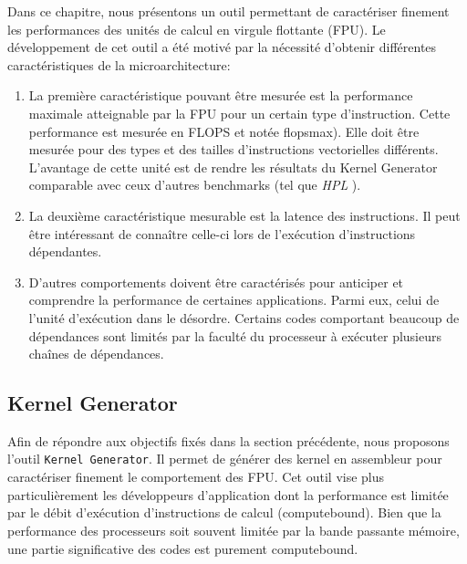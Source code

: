         Dans ce chapitre, nous présentons  un outil permettant de caractériser finement les performances des unités de calcul en virgule flottante (\gls{FPU}). Le développement de cet outil a été motivé par la nécessité d'obtenir différentes caractéristiques de la microarchitecture:
        \begin{enumerate}
            \item La première caractéristique pouvant être mesurée est la performance maximale atteignable par la FPU pour un certain type d'instruction. Cette performance est mesurée en \gls{FLOPS} et notée \gls{flopsmax}). Elle doit être mesurée pour des types et des tailles d'instructions vectorielles différents. L'avantage de cette unité est de rendre les résultats du Kernel Generator comparable avec ceux d'autres benchmarks (tel que \textit{HPL} \cite{Dongarra2003}).
            
            \item La deuxième caractéristique mesurable est la latence des instructions. Il peut être intéressant de connaître celle-ci lors de l'exécution d'instructions dépendantes.
            
            \item D'autres comportements doivent être caractérisés pour anticiper et comprendre la performance de certaines applications. Parmi eux, celui de l'unité d'exécution dans le désordre. Certains codes comportant beaucoup de dépendances sont limités par la faculté du processeur à exécuter plusieurs chaînes de dépendances. 
        
        \end{enumerate}
 
        
\subsection{Kernel Generator}    

        Afin de répondre aux objectifs fixés dans la section précédente, nous proposons l'outil \verb=Kernel Generator=. Il permet de générer des \gls{kernel} en assembleur pour caractériser finement le comportement des \gls{FPU}. Cet outil vise plus particulièrement les développeurs d'application dont la performance est limitée par le débit d'exécution d'instructions de calcul (\gls{computebound}). Bien que la performance des processeurs soit souvent limitée par la bande passante mémoire, une partie significative des codes est purement \gls{computebound}. 
        
